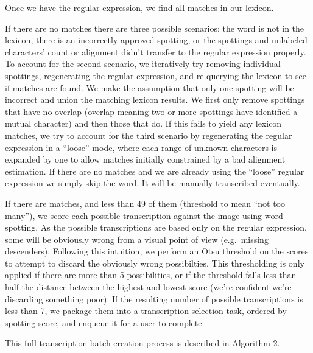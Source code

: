 \documentclass[ms,electronic,twosidetoc,letterpaper,chaptercenter,parttop,lof,lot]{byumsphd}
\begin{document}
Once we have the regular expression, we find all matches in our lexicon.

If there are no matches there are three possible scenarios: the word is not in the lexicon, there is an incorrectly approved spotting, or the spottings and unlabeled characters' count or alignment didn't transfer to the regular expression properly.
To account for the second scenario, we iteratively try removing individual spottings, regenerating the regular expression, and re-querying the lexicon to see if matches are found. We make the assumption that only one spotting will be incorrect and union the matching lexicon results. We first only remove spottings that have no overlap (overlap meaning two or more spottings have identified a mutual character) and then those that do.
If this fails to yield any lexicon matches, we try to account for the third scenario by regenerating the regular expression in a ``loose'' mode, where each range of unknown characters is expanded by one to allow matches initially constrained by a bad alignment estimation.
If there are no matches and we are already using the ``loose'' regular expression we simply skip the word. It will be manually transcribed eventually.

If there are matches, and less than 49 of them (threshold to mean ``not too many''), we score each possible transcription against the image using word spotting.
As the possible transcriptions are based only on the regular expression, some will be obviously wrong from a visual point of view (e.g.~missing descenders). Following this intuition, we perform an Otsu threshold on the scores to attempt to discard the obviously wrong possibilties. This thresholding is only applied if there are more than 5 possibilities, or if the threshold falls less than half the distance between the highest and lowest score (we're confident we're discarding something poor).
If the resulting number of possible transcriptions is less than 7, we package them into a transcription selection task, ordered by spotting score, and enqueue it for a user to complete.

This full transcription batch creation process is described in Algorithm 2.
\end{document}
